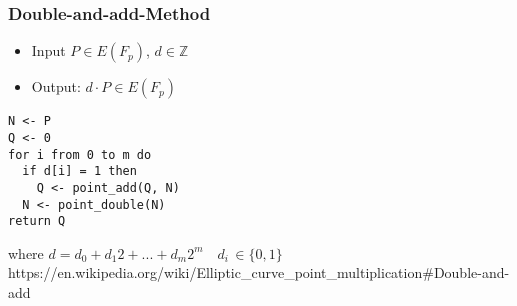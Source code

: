 \begin{frame}[fragile]
\frametitle{Double-and-add-Method}
\begin{itemize}
\item{Input $P \in E(F_p)$, $d \in \mathbb{Z}$}
\item{Output: $d\cdot P \in E(F_p)$}
\end{itemize}
\begin{lstlisting}[frame=single]
N <- P
Q <- 0
for i from 0 to m do
  if d[i] = 1 then
    Q <- point_add(Q, N)
  N <- point_double(N)
return Q
\end{lstlisting}
where
$d = d_0 + d_1 2 + ... + d_m 2^m \quad d_i \, \in \{0,1\}$
\vfill
\tiny{https://en.wikipedia.org/wiki/Elliptic\_curve\_point\_multiplication\#Double-and-add}
\end{frame}
